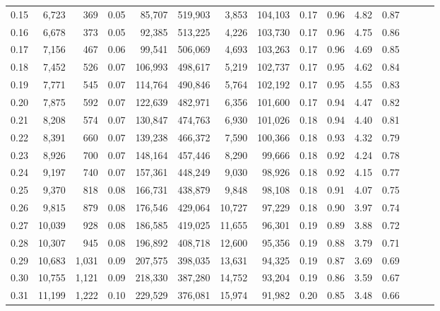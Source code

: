 \begin{tabular}{rrrrrrrrrrrrrrr}
0.15 &   6,723 &    369 &  0.05 &   85,707 &  519,903 &    3,853 &  104,103 &  0.17 &  0.96 &  4.82 &      0.87 \\
0.16 &   6,678 &    373 &  0.05 &   92,385 &  513,225 &    4,226 &  103,730 &  0.17 &  0.96 &  4.75 &      0.86 \\
0.17 &   7,156 &    467 &  0.06 &   99,541 &  506,069 &    4,693 &  103,263 &  0.17 &  0.96 &  4.69 &      0.85 \\
0.18 &   7,452 &    526 &  0.07 &  106,993 &  498,617 &    5,219 &  102,737 &  0.17 &  0.95 &  4.62 &      0.84 \\
0.19 &   7,771 &    545 &  0.07 &  114,764 &  490,846 &    5,764 &  102,192 &  0.17 &  0.95 &  4.55 &      0.83 \\
0.20 &   7,875 &    592 &  0.07 &  122,639 &  482,971 &    6,356 &  101,600 &  0.17 &  0.94 &  4.47 &      0.82 \\
0.21 &   8,208 &    574 &  0.07 &  130,847 &  474,763 &    6,930 &  101,026 &  0.18 &  0.94 &  4.40 &      0.81 \\
0.22 &   8,391 &    660 &  0.07 &  139,238 &  466,372 &    7,590 &  100,366 &  0.18 &  0.93 &  4.32 &      0.79 \\
0.23 &   8,926 &    700 &  0.07 &  148,164 &  457,446 &    8,290 &   99,666 &  0.18 &  0.92 &  4.24 &      0.78 \\
0.24 &   9,197 &    740 &  0.07 &  157,361 &  448,249 &    9,030 &   98,926 &  0.18 &  0.92 &  4.15 &      0.77 \\
0.25 &   9,370 &    818 &  0.08 &  166,731 &  438,879 &    9,848 &   98,108 &  0.18 &  0.91 &  4.07 &      0.75 \\
0.26 &   9,815 &    879 &  0.08 &  176,546 &  429,064 &   10,727 &   97,229 &  0.18 &  0.90 &  3.97 &      0.74 \\
0.27 &  10,039 &    928 &  0.08 &  186,585 &  419,025 &   11,655 &   96,301 &  0.19 &  0.89 &  3.88 &      0.72 \\
0.28 &  10,307 &    945 &  0.08 &  196,892 &  408,718 &   12,600 &   95,356 &  0.19 &  0.88 &  3.79 &      0.71 \\
0.29 &  10,683 &  1,031 &  0.09 &  207,575 &  398,035 &   13,631 &   94,325 &  0.19 &  0.87 &  3.69 &      0.69 \\
0.30 &  10,755 &  1,121 &  0.09 &  218,330 &  387,280 &   14,752 &   93,204 &  0.19 &  0.86 &  3.59 &      0.67 \\
0.31 &  11,199 &  1,222 &  0.10 &  229,529 &  376,081 &   15,974 &   91,982 &  0.20 &  0.85 &  3.48 &      0.66 \\

\end{tabular}
